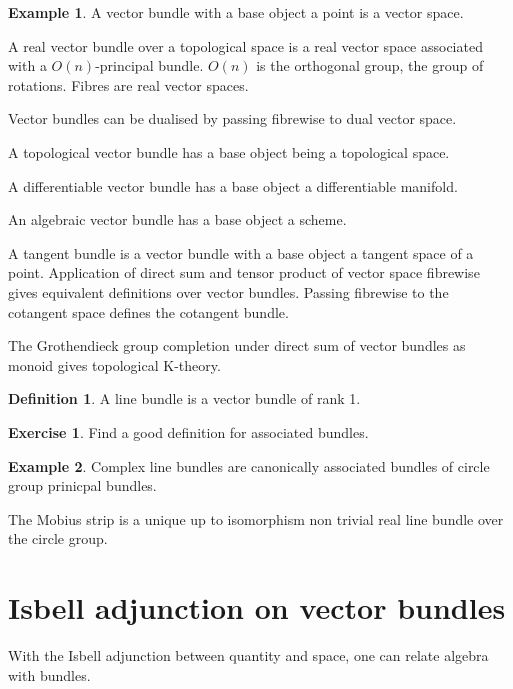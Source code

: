 \documentclass[10pt]{article}
\theoremstyle{plain}%
\theoremstyle{definition}
\newtheorem{definition}{Definition}[section]
\newtheorem{example}{Example}[section]
\newtheorem{exercise}{Exercise}[section]
\theoremstyle{remark}
\begin{document}
\begin{example}
	A vector bundle with a base object a point is a vector space.

	A real vector bundle over a topological space is a real vector space associated with a $O(n)$-principal bundle. $O(n)$ is the orthogonal group, the group of rotations. Fibres are real vector spaces.

	Vector bundles can be dualised by passing fibrewise to dual vector space.

	A topological vector bundle has a base object being a topological space.

	A differentiable vector bundle has a base object a differentiable manifold.

	An algebraic vector bundle has a base object a scheme.

	A tangent bundle is a vector bundle with a base object a tangent space of a point.
	Application of direct sum and tensor product of vector space fibrewise gives equivalent definitions over vector bundles. Passing fibrewise to the cotangent space defines the cotangent bundle.
	
	The Grothendieck group completion under direct sum of vector bundles as monoid gives topological K-theory.
\end{example}

\begin{definition}
	A line bundle is a vector bundle of rank 1.
\end{definition}

\begin{exercise}
	Find a good definition for associated bundles.
\end{exercise}

\begin{example}
	Complex line bundles are canonically associated bundles of circle group prinicpal bundles.

	The Mobius strip is a unique up to isomorphism non trivial real line bundle over the circle group.
\end{example}

\section{Isbell adjunction on vector bundles}

With the Isbell adjunction between quantity and space, one can relate algebra with bundles.
\end{document}
